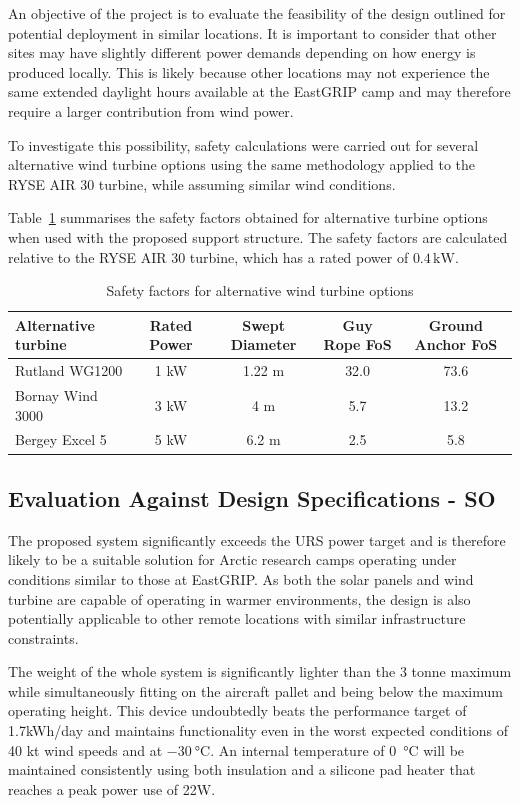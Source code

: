 \documentclass[11pt,a4paper]{article}
\begin{document}
An objective of the project is to evaluate the feasibility of the design outlined for potential deployment in similar locations. It is important to consider that other sites may have slightly different power demands depending on how energy is produced locally. This is likely because other locations may not experience the same extended daylight hours available at the EastGRIP camp and may therefore require a larger contribution from wind power.

To investigate this possibility, safety calculations were carried out for several alternative wind turbine options using the same methodology applied to the RYSE AIR 30 turbine, while assuming similar wind conditions.

Table~\ref{tab:alt_turbines} summarises the safety factors obtained for alternative turbine options when used with the proposed support structure. The safety factors are calculated relative to the RYSE AIR 30 turbine, which has a rated power of $0.4\,\mathrm{kW}$.

\begin{table}[H]
\centering
\caption{Safety factors for alternative wind turbine options}
\label{tab:alt_turbines}
\begin{tabular}{>{\raggedright\arraybackslash}p{4cm} c c c c}
\hline
Alternative turbine & Rated Power & Swept Diameter & Guy Rope FoS & Ground Anchor FoS \\
\hline
Rutland WG1200 & 1 kW & 1.22 m & 32.0 & 73.6 \\
Bornay Wind 3000 & 3 kW & 4 m & 5.7 & 13.2 \\
Bergey Excel 5 & 5 kW & 6.2 m & 2.5 & 5.8 \\
\hline
\end{tabular}
\end{table}

\subsection{Evaluation Against Design Specifications - SO}
The proposed system significantly exceeds the URS power target and is therefore likely to be a suitable solution for Arctic research camps operating under conditions similar to those at EastGRIP. As both the solar panels and wind turbine are capable of operating in warmer environments, the design is also potentially applicable to other remote locations with similar infrastructure constraints.

The weight of the whole system is significantly lighter than the 3 tonne maximum while simultaneously fitting on the aircraft pallet and being below the maximum operating height. This device undoubtedly beats the performance target of 1.7kWh/day and maintains functionality even in the worst expected conditions of 40 kt wind speeds and at \(-\SI{30}{\celsius}\). An internal temperature of \SI{0}{\celsius} will be maintained consistently using both insulation and a silicone pad heater that reaches a peak power use of 22W.
\end{document}
